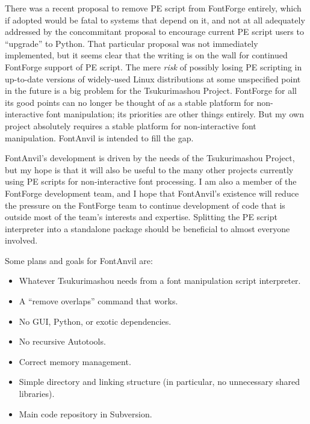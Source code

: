 \documentclass[11pt]{report}
\begin{document}
There was a recent proposal to remove PE script from FontForge entirely,
which if adopted would be fatal to systems that depend on it, and not at all
adequately addressed by the concommitant proposal to encourage current PE
script users to ``upgrade'' to Python.  That particular proposal was not
immediately implemented, but it seems clear that the writing is on the wall
for continued FontForge support of PE script.  The mere \emph{risk} of
possibly losing PE scripting in up-to-date versions of widely-used Linux
distributions at some unspecified point in the future is a big problem for
the Tsukurimashou Project.  FontForge for all its good points can no longer
be thought of as a stable platform for non-interactive font manipulation;
its priorities are other things entirely.  But my own project absolutely
requires a stable platform for non-interactive font manipulation.  FontAnvil
is intended to fill the gap.

FontAnvil's development is driven by the needs of the Tsukurimashou Project,
but my hope is that it will also be useful to the many other projects
currently using PE scripts for non-interactive font processing.  I am also a
member of the FontForge development team, and I hope that FontAnvil's
existence will reduce the pressure on the FontForge team to continue
development of code that is outside most of the team's interests and
expertise.  Splitting the PE script interpreter into a standalone package
should be beneficial to almost everyone involved.

Some plans and goals for FontAnvil are:
\begin{itemize}
\item Whatever Tsukurimashou needs from a font manipulation script
  interpreter.
\item A ``remove overlaps'' command that works.
\item No GUI, Python, or exotic dependencies.
\item No recursive Autotools.
\item Correct memory management.
\item Simple directory and linking structure (in particular, no
  unnecessary shared libraries).
\item Main code repository in Subversion.
\end{itemize}
\end{document}
